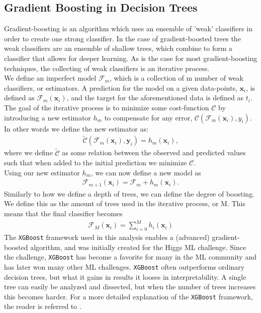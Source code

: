 \subsection{Gradient Boosting in Decision Trees}
Gradient-boosting is an algorithm which uses an ensemble of 'weak' 
classifiers in order to create one strong classifier. In the case of gradient-boosted 
trees the weak classifiers are an ensemble of shallow trees, which combine to form a classifier 
that allows for deeper learning. As is the case for most gradient-boosting 
techniques, the collecting of weak classifiers is an iterative process.
\\
We define an imperfect model $\mathcal{F}_m$, which is a collection of m number of weak 
classifiers, or estimators. A prediction for the model on a given data-points, $\textbf{x}_i$, is 
defined as $\mathcal{F}_m(\textbf{x}_i)$, and the target for the aforementioned data is 
defined as $t_i$. The goal of the iterative process is to minimize some cost-function 
$\mathcal{C}$ by introducing a new estimator $h_m$ to compensate for any error, 
$\mathcal{C}(\mathcal{F}_m(\textbf{x}_i), y_i)$. In other words we define the new estimator as:
\begin{align}
    \tilde{\mathcal{C}}(\mathcal{F}_m(\textbf{x}_i), \textbf{y}_i) = h_m(\textbf{x}_i),
\end{align}
where we define $\tilde{\mathcal{C}}$ as some relation between the observed and 
predicted values such that when added to the initial prediction we minimize $\mathcal{C}$.
\\
Using our new estimator $h_m$, we can now define a new model as
\begin{align}
    \mathcal{F}_{m+1}(\textbf{x}_i) = \mathcal{F}_m + h_m (\textbf{x}_i).
\end{align}
Similarly to how we define a depth of trees, we can define the degree of boosting. We define 
this as the amount of trees used in the iterative process, or M. This means that the final classifier 
becomes
\begin{align}
    \mathcal{F}_M (\textbf{x}_i) = \sum_{i=0}^M h_i(\textbf{x}_i)
\end{align} 
The \verb!XGBoost! \cite{XGB} framework used in this analysis enables a (advanced) gradient-boosted algorithm, 
and was initially created for the Higgs ML challenge. Since the challenge, \verb!XGBoost! has become 
a favorite for many in the \ac{ML} community and has later won many other ML challenges. \verb!XGBoost! 
often outperforms ordinary decision trees, but what it gains in results it looses in 
interpretability. A single tree can easily be analyzed and dissected, but when the number 
of trees increases this becomes harder. For a more detailed explanation of the \verb!XGBoost! framework,
the reader is referred to \cite{XGB}.